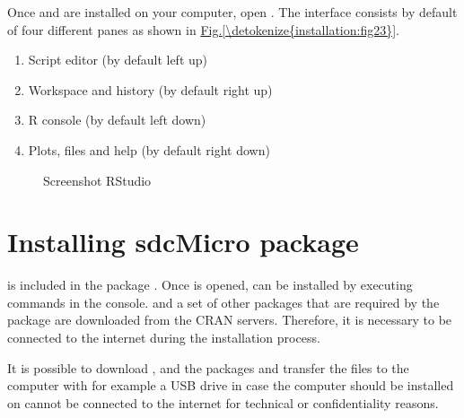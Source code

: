 \documentclass[letterpaper,10pt,english]{sphinxmanual}
\begin{document}
Once  and  are installed on your computer, open . The  interface consists
by default of four different panes as shown in \hyperref[\detokenize{installation:fig23}]{Fig.\@ \ref{\detokenize{installation:fig23}}}.
\begin{enumerate}
\item {} 
Script editor (by default left up)

\item {} 
Workspace and history (by default right up)

\item {} 
R console (by default left down)

\item {} 
Plots, files and help (by default right down)

\end{enumerate}

\begin{figure}[htbp]
\centering
\capstart

\noindent{}
\caption{Screenshot RStudio}\label{\detokenize{installation:fig23}}\label{\detokenize{installation:id12}}\end{figure}


\section{Installing sdcMicro package}
\label{\detokenize{installation:installing-sdcmicro-package}}
 is included in the  package . Once  is opened,  can be
installed by executing commands in the  console.  and a set of other  packages
that are required by the  package are downloaded from the CRAN servers. Therefore,
it is necessary to be connected to the internet during the installation process. %
\begin{footnote}[3]\sphinxAtStartFootnote
It is possible to download ,  and the packages and transfer the files to the computer with for example a USB drive in case the computer
 should be installed on cannot be connected to the internet for technical or confidentiality reasons.
%
\end{footnote}
\end{document}
